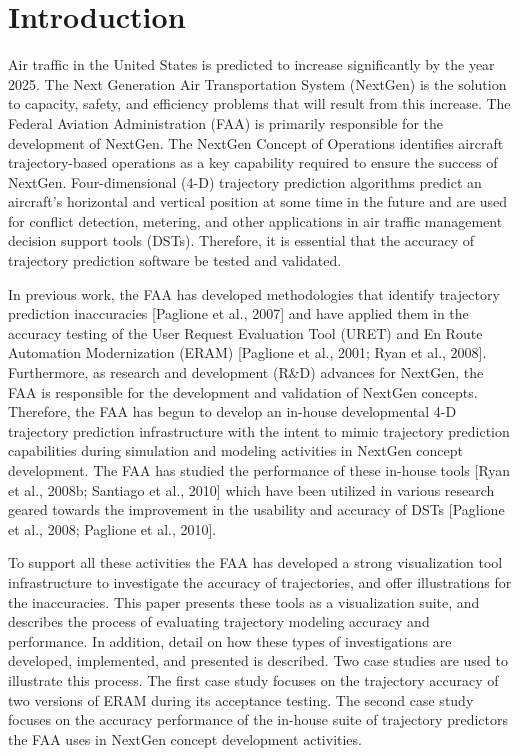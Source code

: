 \documentclass[]{article}
\begin{document}
         
\section{Introduction}
\label{introduction}


Air traffic in the United States is predicted to increase significantly by the year 2025. The Next Generation Air Transportation System (NextGen) is the solution to capacity, safety, and efficiency problems that will result from this increase. The Federal Aviation Administration (FAA) is primarily responsible for the development of NextGen. The NextGen Concept of Operations identifies aircraft trajectory-based operations as a key capability required to ensure the success of NextGen. Four-dimensional (4-D) trajectory prediction algorithms predict an aircraft’s horizontal and vertical position at some time in the future and are used for conflict detection, metering, and other applications in air traffic management decision support tools (DSTs). Therefore, it is essential that the accuracy of trajectory prediction software be tested and validated. 

In previous work, the FAA has developed methodologies that identify trajectory prediction inaccuracies [Paglione et al., 2007] and have applied them in the accuracy testing of the User Request Evaluation Tool (URET) and En Route Automation Modernization (ERAM) [Paglione et al., 2001; Ryan et al., 2008]. Furthermore, as research and development (R\&D) advances for NextGen, the FAA is responsible for the development and validation of NextGen concepts. Therefore, the FAA has begun to develop an in-house developmental 4-D trajectory prediction infrastructure with the intent to mimic trajectory prediction capabilities during simulation and modeling activities in NextGen concept development. The FAA has studied the performance of these in-house tools [Ryan et al., 2008b; Santiago et al., 2010] which have been utilized in various research geared towards the improvement in the usability and accuracy of DSTs [Paglione et al., 2008; Paglione et al., 2010].

To support all these activities the FAA has developed a strong visualization tool infrastructure to investigate the accuracy of trajectories, and offer illustrations for the inaccuracies. This paper presents these tools as a visualization suite, and describes the process of evaluating trajectory modeling accuracy and performance. In addition, detail on how these types of investigations are developed, implemented, and presented is described. Two case studies are used to illustrate this process. The first case study focuses on the trajectory accuracy of two versions of ERAM during its acceptance testing. The second case study focuses on the accuracy performance of the in-house suite of trajectory predictors the FAA uses in NextGen concept development activities.
\end{document}
